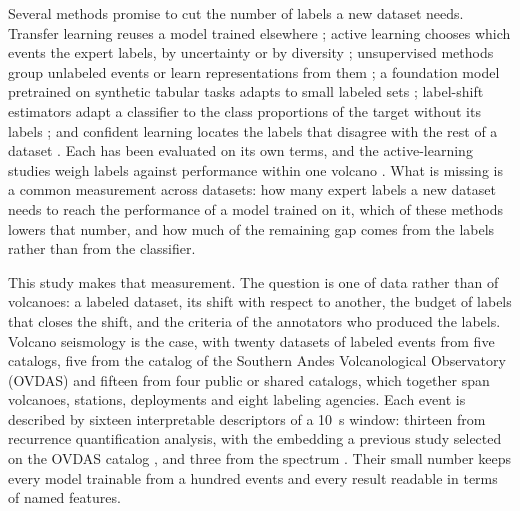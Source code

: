 \documentclass[pdflatex,sn-mathphys-num]{sn-jnl}
\begin{document}
Several methods promise to cut the number of labels a new dataset needs.
Transfer learning reuses a model trained elsewhere
\cite{titos_classification_2020,bueno_volcano-seismic_2020}; active learning
chooses which events the expert labels, by uncertainty
\cite{bueno_continuous_2022} or by diversity \cite{manley_deep_2022};
unsupervised methods group unlabeled events or learn representations from
them \cite{duque_exploring_2020,rios_learning_2024}; a foundation model
pretrained on synthetic tabular tasks adapts to small labeled sets
\cite{hollmann_accurate_2025}; label-shift estimators adapt a classifier to
the class proportions of the target without its labels
\cite{lipton_detecting_2018,saerens_adjusting_2002}; and confident learning
locates the labels that disagree with the rest of a dataset
\cite{northcutt_confident_2021}. Each has been evaluated on its own terms,
and the active-learning studies weigh labels against performance within one
volcano \cite{bueno_continuous_2022,manley_deep_2022}. What is missing is a
common measurement across datasets: how many expert labels a new dataset
needs to reach the performance of a model trained on it, which of these
methods lowers that number, and how much of the remaining gap comes from the
labels rather than from the classifier.

This study makes that measurement. The question is one of data rather than
of volcanoes: a labeled dataset, its shift with respect to another, the
budget of labels that closes the shift, and the criteria of the annotators
who produced the labels. Volcano seismology is the case, with twenty
datasets of labeled events from five catalogs, five from the catalog of the
Southern Andes Volcanological Observatory (OVDAS) and fifteen from four
public or shared catalogs, which together span volcanoes, stations,
deployments and eight labeling agencies. Each event is described by sixteen
interpretable descriptors of a 10~s window: thirteen from recurrence
quantification analysis, with the embedding a previous study selected on
the OVDAS catalog \cite{morales_recurrence_2026}, and three from the
spectrum \cite{cui_subdivision_2021}. Their small number keeps every model
trainable from a hundred events and every result readable in terms of named
features.
\end{document}
